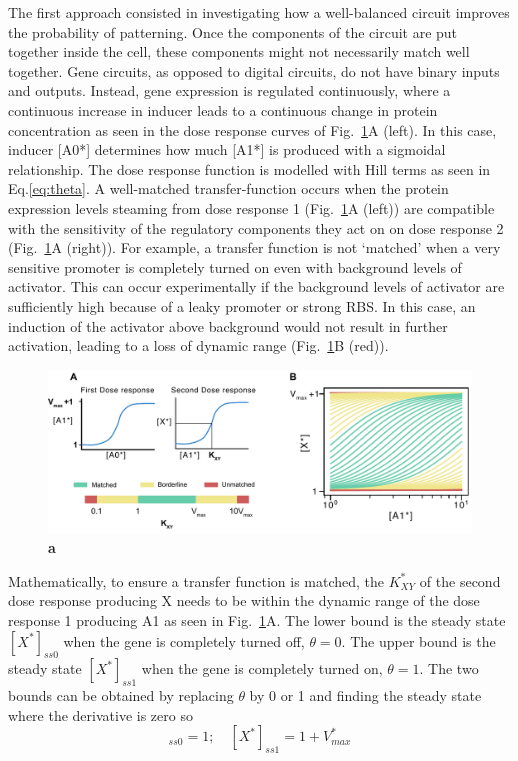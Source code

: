 The first approach consisted in investigating how a well-balanced circuit improves the probability of patterning.
Once the components of the circuit are put together inside the cell, these components might not necessarily match well together.
Gene circuits, as opposed to digital circuits, do not have binary inputs and outputs.
Instead, gene expression is regulated continuously, where a continuous increase in inducer leads to a continuous change in protein concentration as seen in the dose response curves of Fig.~\ref{fig:balancing}A (left).
In this case, inducer [A0*] determines how much [A1*] is produced with a sigmoidal relationship.
The dose response function is modelled with Hill terms as seen in Eq.\ref{eq:theta}.
A well-matched transfer-function occurs when the protein expression levels steaming from dose response 1 (Fig.~\ref{fig:balancing}A (left)) are compatible with the sensitivity of the regulatory components they act on on dose response 2 (Fig.~\ref{fig:balancing}A (right)).
For example, a transfer function is not ‘matched’ when a very sensitive promoter is completely turned on even with background levels of activator.
This can occur experimentally if the background levels of activator are sufficiently high because of a leaky promoter or strong RBS.
In this case, an induction of the activator above background would not result in further activation, leading to a loss of dynamic range (Fig.~\ref{fig:balancing}B (red)).


\begin{figure}[H]
    \centering
    \includegraphics[width=1\textwidth]{chapters/Chapter 2/balancing}
    \caption[]{\textbf{a} } %
    \label{fig:balancing}
\end{figure}


Mathematically, to ensure a transfer function is matched, the $K^*_{XY}$ of the second dose response producing X needs to be within the dynamic range of the dose response 1 producing A1 as seen in Fig.~\ref{fig:balancing}A.
The lower bound is the steady state $[X^*]_{ss0}$ when the gene is completely turned off, $\theta=0$.
The upper bound is the steady state $[X^*]_{ss1}$ when the gene is completely turned on, $\theta=1$.
The two bounds can be obtained by replacing $\theta$ by 0 or 1 and finding the steady state where the derivative is zero so
\begin{equation}
    [X^*]_{ss0}=1; \quad [X^*]_{ss1}=1+V^*_{max}
    \label{1toVmax}
\end{equation}


